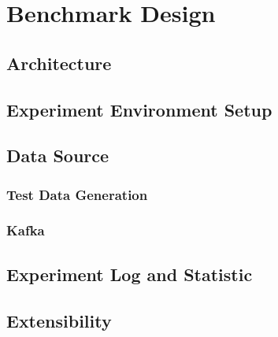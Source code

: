 \section{Benchmark Design}

\subsection{Architecture}

\subsection{Experiment Environment Setup}

\subsection{Data Source}
\subsubsection{Test Data Generation}
\subsubsection{Kafka}

\subsection{Experiment Log and Statistic}

\subsection{Extensibility}

\clearpage